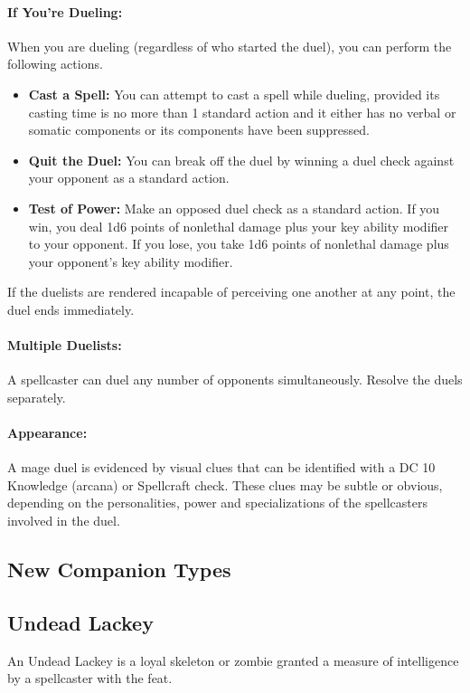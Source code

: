 \paragraph{If You're Dueling:} When you are dueling (regardless of who started the duel), you can perform the following actions.
\begin{itemize}
 \item \textbf{Cast a Spell:} You can attempt to cast a spell while dueling, provided its casting time is no more than 1 standard action and it either has no verbal or somatic components or its components have been suppressed.
 \item \textbf{Quit the Duel:} You can break off the duel by winning a duel check against your opponent as a standard action.
 \item \textbf{Test of Power:} Make an opposed duel check as a standard action. If you win, you deal 1d6 points of nonlethal damage plus your key ability modifier to your opponent. If you lose, you take 1d6 points of nonlethal damage plus your opponent's key ability modifier.
\end{itemize}
If the duelists are rendered incapable of perceiving one another at any point, the duel ends immediately.
\paragraph{Multiple Duelists:} A spellcaster can duel any number of opponents simultaneously. Resolve the duels separately.
\paragraph{Appearance:} A mage duel is evidenced by visual clues that can be identified with a DC 10 Knowledge (arcana) or Spellcraft check. These clues may be subtle or obvious, depending on the personalities, power and specializations of the spellcasters involved in the duel.

\subsection{New Companion Types}
\subsection{Undead Lackey}
\label{sec:UndeadLackey}
An Undead Lackey is a loyal skeleton or zombie granted a measure of intelligence by a spellcaster with the  feat.

